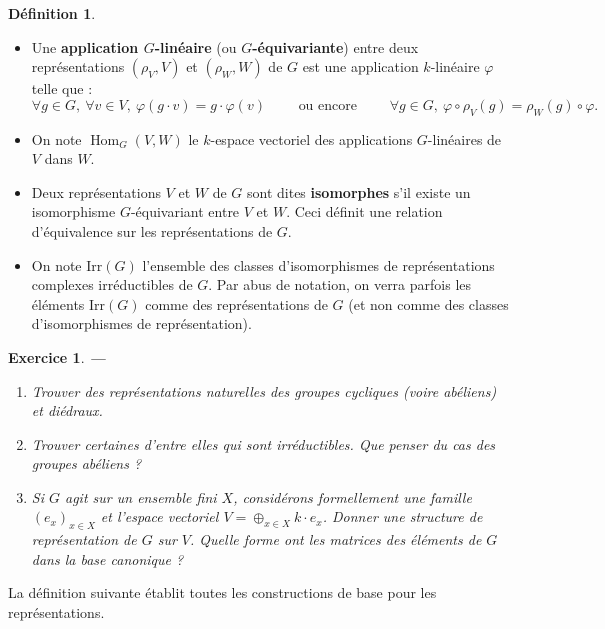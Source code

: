 \documentclass[a4paper]{article}
\newcounter{question}
\newtheorem{enonce}{Exercice}
\newenvironment{exo}[0]{\begin{enonce}{\bf ---}\rm\setcounter{question}{1}}{\end{enonce}}
\theoremstyle{definition} %
\newtheorem{Def}{Définition}[section] %
\theoremstyle{plain} %
\theoremstyle{remark} %
\newcommand{\Irr}{\mathrm{Irr}(G)}
\begin{document}
\begin{Def}
 	\hspace*{\fill}
\begin{itemize}
 	\item Une \textbf{application $G$-linéaire} (ou \textbf{$G$-équivariante}) entre deux représentations $(\rho_V,V)$ et $(\rho_W,W)$ de $G$ est une application $k$-linéaire $\varphi$ telle que :
 	$$\forall g\in G,\ \forall v\in V,\ \varphi(g \cdot v) = g \cdot \varphi(v) \qquad \text{ ou encore } \qquad \forall g \in G,\ \varphi \circ \rho_V(g) = \rho_W(g) \circ \varphi.$$
 	\item On note $\operatorname{Hom}_G(V,W)$ le $k$-espace vectoriel des applications $G$-linéaires de $V$ dans $W$.
 	\item Deux représentations $V$ et $W$ de $G$ sont dites \textbf{isomorphes} s'il existe un isomorphisme $G$-équivariant entre $V$ et $W$.
 	Ceci définit une relation d'équivalence sur les représentations de $G$.
 	
 	\item On note $\Irr$ l'ensemble des classes d'isomorphismes de représentations complexes irréductibles de $G$. Par abus de notation, on verra parfois les éléments $\Irr$ comme des représentations de $G$ (et non comme des classes d'isomorphismes de représentation).
\end{itemize}
\end{Def}

\begin{exo}
	\hspace*{\fill}
	\begin{enumerate}
	\item Trouver des représentations naturelles des groupes cycliques (voire abéliens) et diédraux.
	\item Trouver certaines d'entre elles qui sont irréductibles. Que penser du cas des groupes abéliens ?
	\item Si $G$ agit sur un ensemble fini $X$, considérons formellement une famille $(e_x)_{x \in X}$ et l'espace vectoriel $ V = \oplus_{x \in X} k \cdot e_x$.
	Donner une structure de représentation de $G$ sur $V$. Quelle forme ont les matrices des éléments de $G$ dans la base canonique ?
	\end{enumerate}
\end{exo}



La définition suivante établit toutes les constructions de base pour les représentations.
 	
\end{document}
